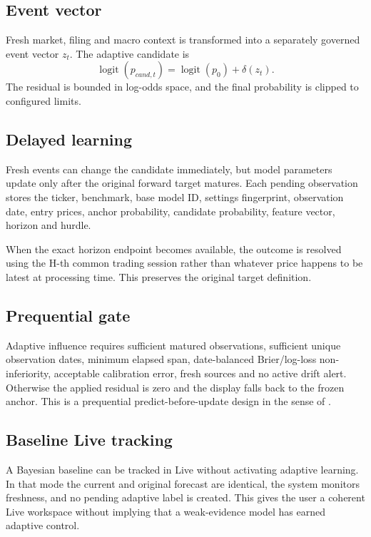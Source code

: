 \documentclass[11pt]{article}
\newcommand{\logit}{\operatorname{logit}}
\begin{document}
\subsection{Event vector}
Fresh market, filing and macro context is transformed into a separately governed event vector $z_t$. The adaptive candidate is
\begin{equation}
\logit(p_{cand,t})=\logit(p_0)+\delta(z_t).
\end{equation}
The residual is bounded in log-odds space, and the final probability is clipped to configured limits.

\subsection{Delayed learning}
Fresh events can change the candidate immediately, but model parameters update only after the original forward target matures. Each pending observation stores the ticker, benchmark, base model ID, settings fingerprint, observation date, entry prices, anchor probability, candidate probability, feature vector, horizon and hurdle.

When the exact horizon endpoint becomes available, the outcome is resolved using the H-th common trading session rather than whatever price happens to be latest at processing time. This preserves the original target definition.

\subsection{Prequential gate}
Adaptive influence requires sufficient matured observations, sufficient unique observation dates, minimum elapsed span, date-balanced Brier/log-loss non-inferiority, acceptable calibration error, fresh sources and no active drift alert. Otherwise the applied residual is zero and the display falls back to the frozen anchor. This is a prequential predict-before-update design in the sense of \citet{dawid1984prequential}.

\subsection{Baseline Live tracking}
A Bayesian baseline can be tracked in Live without activating adaptive learning. In that mode the current and original forecast are identical, the system monitors freshness, and no pending adaptive label is created. This gives the user a coherent Live workspace without implying that a weak-evidence model has earned adaptive control.
\end{document}
